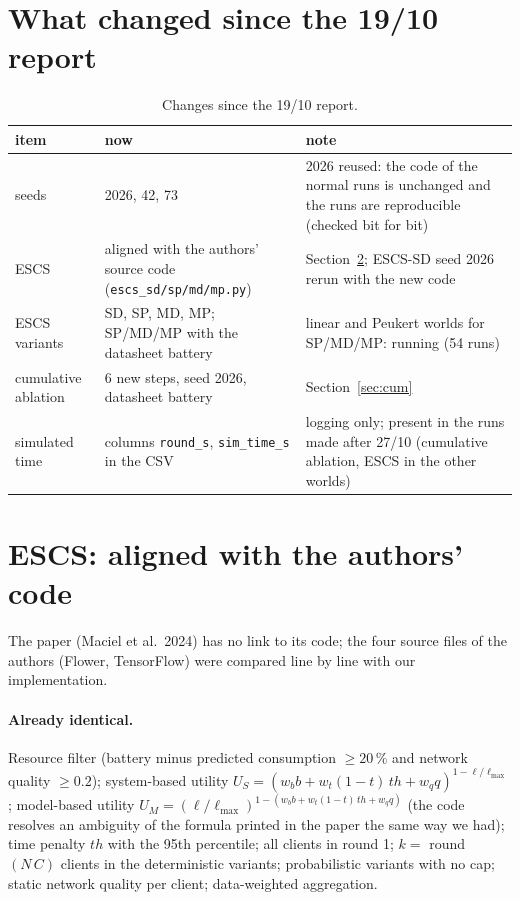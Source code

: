 \documentclass[11pt,a4paper]{article}
\begin{document}
\section{What changed since the 19/10 report}

\begin{table}[H]
\centering
\small
\caption{Changes since the 19/10 report.}
\label{tab:changes}
\begin{tabular}{p{3.2cm}p{5.6cm}p{6.2cm}}
\toprule
item & now & note \\
\midrule
seeds & 2026, 42, 73 & 2026 reused: the code of the normal runs is unchanged and the runs are reproducible (checked bit for bit) \\
ESCS & aligned with the authors' source code (\texttt{escs\_sd/sp/md/mp.py}) & Section~\ref{sec:escs}; ESCS-SD seed 2026 rerun with the new code \\
ESCS variants & SD, SP, MD, MP; SP/MD/MP with the datasheet battery & linear and Peukert worlds for SP/MD/MP: running (54 runs) \\
cumulative ablation & 6 new steps, seed 2026, datasheet battery & Section~\ref{sec:cum} \\
simulated time & columns \texttt{round\_s}, \texttt{sim\_time\_s} in the CSV & logging only; present in the runs made after 27/10 (cumulative ablation, ESCS in the other worlds) \\
\bottomrule
\end{tabular}
\end{table}

\section{ESCS: aligned with the authors' code}
\label{sec:escs}

The paper (Maciel et al.\ 2024) has no link to its code; the four source files
of the authors (Flower, TensorFlow) were compared line by line with our
implementation.

\paragraph{Already identical.} Resource filter (battery minus predicted
consumption $\geq 20\,\%$ and network quality $\geq 0.2$); system-based utility
$U_S=(w_b b + w_t(1-t)\,th + w_q q)^{1-\ell/\ell_{\max}}$; model-based utility
$U_M=(\ell/\ell_{\max})^{1-(w_b b + w_t(1-t)\,th + w_q q)}$ (the code resolves
an ambiguity of the formula printed in the paper the same way we had); time
penalty $th$ with the 95th percentile; all clients in round 1; $k=$ round$(N\,C)$
clients in the deterministic variants; probabilistic variants with no cap; static
network quality per client; data-weighted aggregation.
\end{document}
